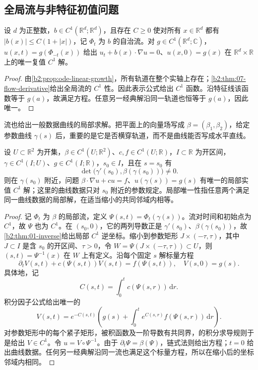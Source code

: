 \subsection{全局流与非特征初值问题}
\label{b2:subsec:070204}

\begin{proposition}\label{b2:prop:07-global-flow}
设 \(d\) 为正整数，\(b\in C^1(\mathbb R^d;\mathbb R^d)\)，且存在 \(C\geq0\) 使对所有 \(x\in\mathbb R^d\) 都有
\( |b(x)|\leq C(1+|x|)\)，记 \(\Phi_t\) 为 \(b\) 的自治流。对 \(g\in C^1(\mathbb R^d;\mathbb C)\)，\(u(x,t)=g(\Phi_{-t}(x))\) 给出 \(u_t+b(x)\cdot\nabla u=0\)、\(u(x,0)=g(x)\) 在 \(\mathbb R^d\times\mathbb R\) 上的唯一复值 \(C^1\) 解。
\end{proposition}
\begin{proof}
由\cref{b2:prop:ode-linear-growth}，所有轨道在整个实轴上存在；\cref{b2:thm:07-flow-derivative}给出全局流的 \(C^1\) 性。因此表示公式给出 \(C^1\) 函数。沿特征线该函数等于 \(g(a)\)，故满足方程。任意另一经典解沿同一轨道也恒等于 \(g(a)\)，因此唯一。
\end{proof}

流也给出一般数据曲线的局部求解。把平面上的向量场写成 \(\beta=(\beta_1,\beta_2)\)，给定参数曲线 \(\gamma(s)\) 后，重要的是它是否横穿轨道，而不是曲线能否写成水平直线。

\begin{proposition}[非特征数据曲线]\label{b2:prop:07-noncharacteristic-data}
设 \(U\subset\mathbb R^2\) 为开集，\(\beta\in C^1(U;\mathbb R^2)\)、\(c,f\in C^1(U;\mathbb R)\)，\(I\subset\mathbb R\) 为开区间，\(\gamma\in C^1(I;U)\)、\(g\in C^1(I;\mathbb R)\)，\(s_0\in I\)，且在 \(s=s_0\) 有
\[
 \det\bigl(\gamma'(s_0),\beta(\gamma(s_0))\bigr)\ne0.
\]
则在 \(\gamma(s_0)\) 附近，问题 \(\beta\cdot\nabla u+cu=f\)、\(u(\gamma(s))=g(s)\) 有唯一的局部实值 \(C^1\) 解；这里的曲线数据只对 \(s_0\) 附近的参数规定。局部唯一性指任意两个满足同一曲线数据的局部解，在适当缩小的共同邻域内相等。
\end{proposition}
\begin{proof}
记 \(\Phi_t\) 为 \(\beta\) 的局部流，定义 \(\Psi(s,t)=\Phi_t(\gamma(s))\)。流对时间和初始点为 \(C^1\)，故 \(\Psi\) 也为 \(C^1\)。在 \((s_0,0)\)，它的两列导数正是 \(\gamma'(s_0)\)、\(\beta(\gamma(s_0))\)，故\cref{b2:thm:01-inverse}给出局部 \(C^1\) 逆坐标。缩小到参数矩形 \(J\times(-\tau,\tau)\)，其中 \(J\subset I\) 是含 \(s_0\) 的开区间、\(\tau>0\)，令 \(W=\Psi(J\times(-\tau,\tau))\subset U\)，则 \((s,t)=\Psi^{-1}(x)\) 在 \(W\) 上有定义。沿每个固定 \(s\) 解标量方程
\[
 \partial_tV(s,t)+c(\Psi(s,t))V(s,t)=f(\Psi(s,t)),
 \quad V(s,0)=g(s).
\]
具体地，记
\[
 C(s,t)=\int_0^t c(\Psi(s,r))\,\mathrm dr.
\]
积分因子公式给出唯一的
\[
 V(s,t)=e^{-C(s,t)}\left(g(s)+
       \int_0^t e^{C(s,r)}f(\Psi(s,r))\,\mathrm dr\right).
\]
对参数矩形中的每个紧子矩形，被积函数及一阶导数有共同界，的积分求导规则于是给出 \(V\in C^1\)。令 \(u=V\circ\Psi^{-1}\)。由于 \(\partial_t\Psi=\beta(\Psi)\)，链式法则给出方程；\(t=0\) 给出曲线数据。任何另一经典解沿同一流也满足这个标量方程，所以在缩小后的坐标邻域内相同。
\end{proof}

